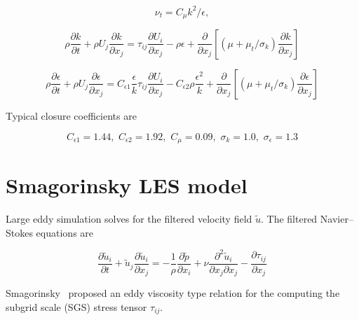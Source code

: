 \begin{equation}
    \nu_t = C_\mu k^2 / \epsilon,
    \label{eq:kepsilon-nut}
\end{equation}

\begin{equation}
    \rho \frac{\partial k}{\partial t}
    + \rho U_j \frac{\partial k}{\partial x_j}
    = \tau_{ij} \frac{\partial U_i}{\partial x_j}
    - \rho \epsilon
    + \frac{\partial}{\partial x_j}
    \left[
    (\mu + \mu_t/\sigma_k) \frac{\partial k}{\partial x_j}
    \right]
    \label{eq:kepsilon-k}
\end{equation}

\begin{equation}
    \rho \frac{\partial \epsilon}{\partial t}
    + \rho U_j \frac{\partial \epsilon}{\partial x_j}
    = C_{\epsilon 1} \frac{\epsilon}{k} \tau_{ij}
    \frac{\partial U_i}{\partial x_j}
    - C_{\epsilon 2} \rho \frac{\epsilon^2}{k}
    + \frac{\partial}{\partial x_j}
    \left[
    (\mu + \mu_t/\sigma_k) \frac{\partial \epsilon}{\partial x_j}
    \right]
    \label{eq:kepsilon-epsilon}
\end{equation}

Typical closure coefficients are

\begin{equation}
    C_{\epsilon 1} = 1.44, \, \,
    C_{\epsilon 2} = 1.92, \, \,
    C_\mu = 0.09, \, \,
    \sigma_k = 1.0, \, \,
    \sigma_\epsilon = 1.3
\end{equation}


\section{Smagorinsky LES model}

Large eddy simulation solves for the filtered velocity field $\tilde{u}$. The
filtered Navier--Stokes equations are


\begin{equation}
    \frac{\partial \tilde{u}_i}{\partial t}
    + \tilde{u}_j \frac{\partial \tilde{u}_i}{\partial x_j}
    = - \frac{1}{\rho} \frac{\partial \tilde{p}}{\partial x_i}
    + \nu \frac{\partial^2 \tilde{u}_i}{\partial x_j \partial x_j}
    - \frac{\partial \tau_{ij}}{\partial x_j}
    \label{eq:filtered-ns}
\end{equation}

Smagorinsky~\cite{Smagorinsky1963} proposed an eddy viscosity type relation for
the computing the subgrid scale (SGS) stress tensor $\tau_{ij}$.

